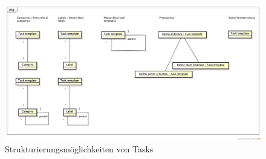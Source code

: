 			\begin{figure}[H]
				\includegraphics[width=\textwidth]{architecture/media/img/taskTemplateStructure.png}
				\centering
				\caption{Strukturierungsmöglichkeiten von Tasks}
				\label{fig:taskTemplateStructure}
			\end{figure}
			
